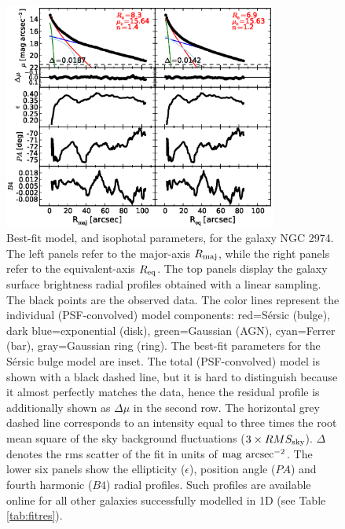 \documentclass[preprint2]{emulateapj}
\newcommand{\fitfigurewidth}{0.8\textwidth}
\begin{document}
\begin{figure}[h]
\begin{center}
\includegraphics[width=\fitfigurewidth]{images/n2974_1Dfit.eps}
\caption{Best-fit model, and isophotal parameters, for the galaxy NGC 2974. 
The left panels refer to the major-axis $R_{\rm maj}$, 
while the right panels refer to the equivalent-axis $R_{\rm eq}$.
The top panels display the galaxy surface brightness radial profiles obtained with a linear sampling. 
The black points are the observed data.  
The color lines represent the individual (PSF-convolved) model components:
red=S\'ersic (bulge), dark blue=exponential (disk), green=Gaussian (AGN), cyan=Ferrer (bar), gray=Gaussian ring (ring). 
The best-fit parameters for the S\'ersic bulge model are inset.
The total (PSF-convolved) model is shown with a black dashed line, 
but it is hard to distinguish because it almost perfectly matches the data, 
hence the residual profile is additionally shown as $\Delta \mu$ in the second row.
The horizontal grey dashed line corresponds to an intensity 
equal to three times the root mean square of the sky background fluctuations ($3 \times RMS_{\rm sky}$).
$\Delta$ denotes the rms scatter of the fit in units of $\rm mag~arcsec^{-2}$.
The lower six panels show the ellipticity ($\epsilon$), position angle ($PA$) and fourth harmonic ($B4$) radial profiles. 
Such profiles are available online for all other galaxies successfully modelled in 1D (see Table \ref{tab:fitres}).}
\label{fig:n2974ex}
\end{center}
\end{figure}
\end{document}

